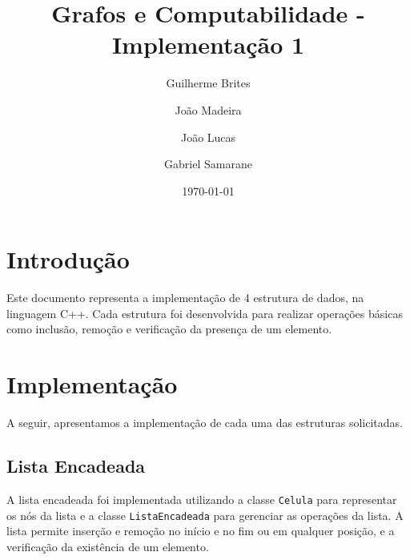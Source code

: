 \documentclass{article}
\title{Grafos e Computabilidade - Implementação 1}
\author{Guilherme Brites \and João Madeira \and João Lucas \and Gabriel Samarane}
\date{\today}
\begin{document}
\maketitle

\section{Introdução}
Este documento representa a implementação de 4 estrutura de dados, na linguagem C++. Cada estrutura foi desenvolvida para realizar operações básicas como inclusão, remoção e
verificação da presença de um elemento.

\section{Implementação}
A seguir, apresentamos a implementação de cada uma das estruturas solicitadas.

\subsection{Lista Encadeada}
A lista encadeada foi implementada utilizando a classe \texttt{Celula} para representar os nós da lista e a classe \texttt{ListaEncadeada} para gerenciar as operações da lista. A lista permite inserção e remoção no início e no fim ou em qualquer posição, e a verificação da existência de um elemento.
\end{document}
